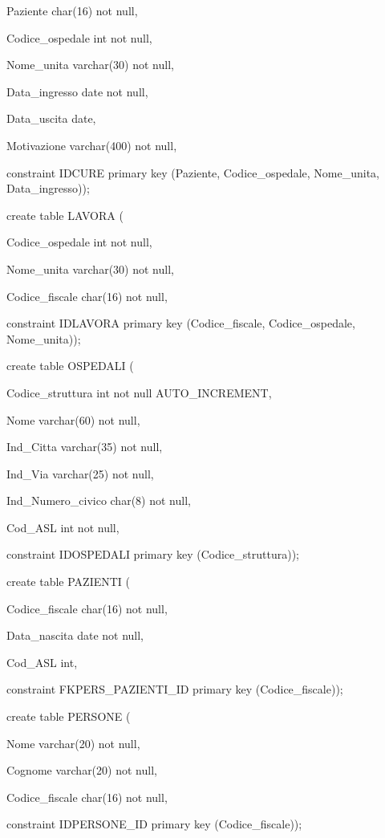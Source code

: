 \documentclass[a4paper,12pt]{report}
\begin{document}
     Paziente char(16) not null,

     Codice\_ospedale int not null,

     Nome\_unita varchar(30) not null,

     Data\_ingresso date not null,

     Data\_uscita date,

     Motivazione varchar(400) not null,

     constraint IDCURE primary key (Paziente, Codice\_ospedale, Nome\_unita, Data\_ingresso)); \newline

\noindent create table LAVORA (

     Codice\_ospedale int not null,

     Nome\_unita varchar(30) not null,

     Codice\_fiscale char(16) not null,

     constraint IDLAVORA primary key (Codice\_fiscale, Codice\_ospedale, Nome\_unita)); \newline

\noindent create table OSPEDALI (

     Codice\_struttura int not null AUTO\_INCREMENT,

     Nome varchar(60) not null,

     Ind\_Citta varchar(35) not null,

     Ind\_Via varchar(25) not null,

     Ind\_Numero\_civico char(8) not null,

     Cod\_ASL int not null,

     constraint IDOSPEDALI primary key (Codice\_struttura)); \newline

\noindent create table PAZIENTI (

     Codice\_fiscale char(16) not null,

     Data\_nascita date not null,

     Cod\_ASL int,

     constraint FKPERS\_PAZIENTI\_ID primary key (Codice\_fiscale)); \newline

\noindent create table PERSONE (

     Nome varchar(20) not null,

     Cognome varchar(20) not null,

     Codice\_fiscale char(16) not null,

     constraint IDPERSONE\_ID primary key (Codice\_fiscale)); \newline
\end{document}
